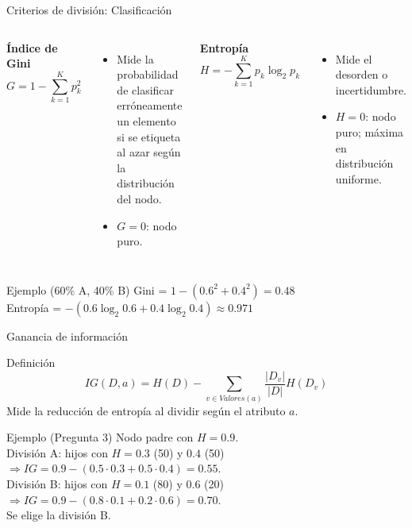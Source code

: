 \documentclass[aspectratio=169, 10pt, xcolor=table]{beamer}
\begin{document}
\begin{frame}{Criterios de división: Clasificación}
    \begin{columns}[t]
        \textbf{Índice de Gini}
        \[
        G = 1 - \sum_{k=1}^{K} p_k^2
        \]
        \begin{itemize}
            \item Mide la probabilidad de clasificar erróneamente un elemento si se etiqueta al azar según la distribución del nodo.
            \item $G=0$: nodo puro.
        \end{itemize}
        \textbf{Entropía}
        \[
        H = -\sum_{k=1}^{K} p_k \log_2 p_k
        \]
        \begin{itemize}
            \item Mide el desorden o incertidumbre.
            \item $H=0$: nodo puro; máxima en distribución uniforme.
        \end{itemize}
    \end{columns}
    \vspace{0.3cm}
    \begin{exampleblock}{Ejemplo (60\% A, 40\% B)}
        Gini = $1 - (0.6^2 + 0.4^2) = 0.48$ \\
        Entropía = $-(0.6\log_2 0.6 + 0.4\log_2 0.4) \approx 0.971$
    \end{exampleblock}
\end{frame}

\begin{frame}{Ganancia de información}
    \begin{block}{Definición}
        \[
        IG(D, a) = H(D) - \sum_{v \in Valores(a)} \frac{|D_v|}{|D|} H(D_v)
        \]
        Mide la reducción de entropía al dividir según el atributo $a$.
    \end{block}
    \begin{exampleblock}{Ejemplo (Pregunta 3)}
        Nodo padre con $H=0.9$. \\
        División A: hijos con $H=0.3$ (50) y $0.4$ (50) $\Rightarrow IG = 0.9 - (0.5\cdot0.3 + 0.5\cdot0.4) = 0.55$. \\
        División B: hijos con $H=0.1$ (80) y $0.6$ (20) $\Rightarrow IG = 0.9 - (0.8\cdot0.1 + 0.2\cdot0.6) = 0.70$. \\
        Se elige la división B.
    \end{exampleblock}
\end{frame}
\end{document}
